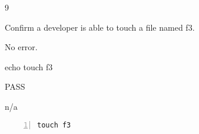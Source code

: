 \begin{description}[align=right,leftmargin=3.2cm,labelindent=3.0cm]
\item[Step:] 9
\item[Confirm:] Confirm a developer is able to touch a file named f3.
\item[Expectation:] No error.
\item[Command:] echo touch  f3
\item[Test Result:] PASS
\item[Evidence:] n/a
\end{description}
\begin{lstlisting}[numbers=left]
touch f3

\end{lstlisting}
